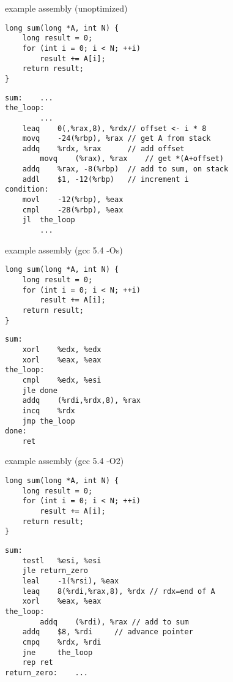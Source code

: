 \begin{frame}[fragile,label=unopt]{example assembly (unoptimized)}
\lstset{language=C,style=smaller}
    \vspace{-.25cm}
\begin{lstlisting}
long sum(long *A, int N) {
    long result = 0;
    for (int i = 0; i < N; ++i)
        result += A[i];
    return result;
}
\end{lstlisting}
\lstset{language=myasm,style=smaller}
\begin{lstlisting}
sum:    ...
the_loop:   
        ...
	leaq	0(,%rax,8), %rdx// offset <- i * 8
	movq	-24(%rbp), %rax // get A from stack
	addq	%rdx, %rax      // add offset
        movq	(%rax), %rax    // get *(A+offset)
	addq	%rax, -8(%rbp)  // add to sum, on stack
	addl	$1, -12(%rbp)   // increment i
condition:
	movl	-12(%rbp), %eax
	cmpl	-28(%rbp), %eax
	jl	the_loop
        ...
\end{lstlisting}
\end{frame}

\begin{frame}[fragile,label=optS]{example assembly (gcc 5.4 -Os)}
\lstset{language=C,style=smaller}
\begin{lstlisting}
long sum(long *A, int N) {
    long result = 0;
    for (int i = 0; i < N; ++i)
        result += A[i];
    return result;
}
\end{lstlisting}
\lstset{language=myasm,style=smaller}
\begin{lstlisting}
sum:
	xorl	%edx, %edx
	xorl	%eax, %eax
the_loop:
	cmpl	%edx, %esi
	jle	done
	addq	(%rdi,%rdx,8), %rax
	incq	%rdx
	jmp	the_loop
done:
	ret
\end{lstlisting}
\end{frame}

\begin{frame}[fragile,label=opt2]{example assembly (gcc 5.4 -O2)}
\lstset{language=C,style=smaller}
\begin{lstlisting}
long sum(long *A, int N) {
    long result = 0;
    for (int i = 0; i < N; ++i)
        result += A[i];
    return result;
}
\end{lstlisting}
\lstset{language=myasm,style=smaller}
    \vspace{-.25cm}
\begin{lstlisting}
sum:
	testl	%esi, %esi
	jle	return_zero
	leal	-1(%rsi), %eax
	leaq	8(%rdi,%rax,8), %rdx // rdx=end of A
	xorl	%eax, %eax
the_loop:    
        addq	(%rdi), %rax // add to sum 
	addq	$8, %rdi     // advance pointer
	cmpq	%rdx, %rdi
	jne     the_loop
	rep ret
return_zero:    ...
\end{lstlisting}
\end{frame}


